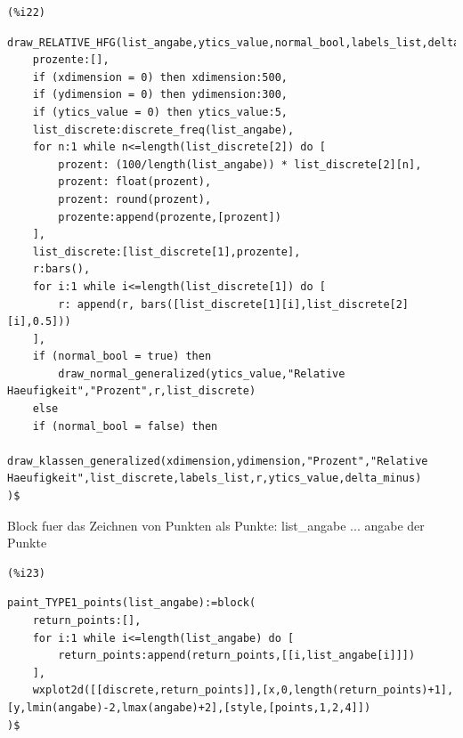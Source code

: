 \documentclass{article}
\begin{document}
\noindent
\begin{minipage}[t]{8ex}{\color{red}\bf
\begin{verbatim}
(%i22) 
\end{verbatim}}
\end{minipage}
\begin{minipage}[t]{\textwidth}{\color{blue}
\begin{verbatim}
draw_RELATIVE_HFG(list_angabe,ytics_value,normal_bool,labels_list,delta_minus,xdimension,ydimension):=block(
    prozente:[],
    if (xdimension = 0) then xdimension:500,
    if (ydimension = 0) then ydimension:300,
    if (ytics_value = 0) then ytics_value:5,
    list_discrete:discrete_freq(list_angabe),
    for n:1 while n<=length(list_discrete[2]) do [
        prozent: (100/length(list_angabe)) * list_discrete[2][n],
        prozent: float(prozent),
        prozent: round(prozent),
        prozente:append(prozente,[prozent])
    ],
    list_discrete:[list_discrete[1],prozente],
    r:bars(),
    for i:1 while i<=length(list_discrete[1]) do [
        r: append(r, bars([list_discrete[1][i],list_discrete[2][i],0.5]))
    ],
    if (normal_bool = true) then
        draw_normal_generalized(ytics_value,"Relative Haeufigkeit","Prozent",r,list_discrete)    
    else
    if (normal_bool = false) then
        draw_klassen_generalized(xdimension,ydimension,"Prozent","Relative Haeufigkeit",list_discrete,labels_list,r,ytics_value,delta_minus)
)$
\end{verbatim}}
\end{minipage}

Block fuer das Zeichnen von Punkten als Punkte:
    list\_angabe ... angabe der Punkte

\noindent
\begin{minipage}[t]{8ex}{\color{red}\bf
\begin{verbatim}
(%i23) 
\end{verbatim}}
\end{minipage}
\begin{minipage}[t]{\textwidth}{\color{blue}
\begin{verbatim}
paint_TYPE1_points(list_angabe):=block(
    return_points:[],
    for i:1 while i<=length(list_angabe) do [
        return_points:append(return_points,[[i,list_angabe[i]]])
    ],
    wxplot2d([[discrete,return_points]],[x,0,length(return_points)+1],[y,lmin(angabe)-2,lmax(angabe)+2],[style,[points,1,2,4]]) 
)$
\end{verbatim}}
\end{minipage}
\end{document}
